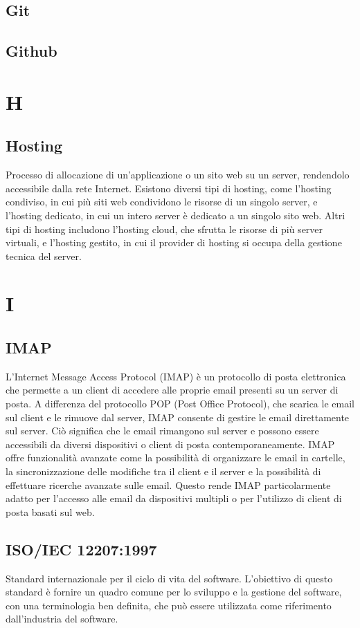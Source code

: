 \documentclass[12pt]{article}
\begin{document}
		\subsection{Git}


		\subsection{Github}
	\clearpage
	\section{H}
		\subsection{Hosting}
			Processo di allocazione di un'applicazione o un sito web su un server, rendendolo accessibile dalla rete Internet. Esistono diversi tipi di hosting, come l'hosting condiviso, in cui più siti web condividono le risorse di un singolo server, e l'hosting dedicato, in cui un intero server è dedicato a un singolo sito web. Altri tipi di hosting includono l'hosting cloud, che sfrutta le risorse di più server virtuali, e l'hosting gestito, in cui il provider di hosting si occupa della gestione tecnica del server.
		
	\clearpage
	\section{I}
		\subsection{IMAP}
			L'Internet Message Access Protocol (IMAP) è un protocollo di posta elettronica che permette a un client di accedere alle proprie email presenti su un server di posta. A differenza del protocollo POP (Post Office Protocol), che scarica le email sul client e le rimuove dal server, IMAP consente di gestire le email direttamente sul server. Ciò significa che le email rimangono sul server e possono essere accessibili da diversi dispositivi o client di posta contemporaneamente. IMAP offre funzionalità avanzate come la possibilità di organizzare le email in cartelle, la sincronizzazione delle modifiche tra il client e il server e la possibilità di effettuare ricerche avanzate sulle email. Questo rende IMAP particolarmente adatto per l'accesso alle email da dispositivi multipli o per l'utilizzo di client di posta basati sul web.
		\subsection{ISO/IEC 12207:1997}
			Standard internazionale per il ciclo di vita del software. L'obiettivo di questo standard è fornire un quadro comune per lo sviluppo e la gestione del software, con una terminologia ben definita, che può essere utilizzata come riferimento dall'industria del software.
\end{document}
